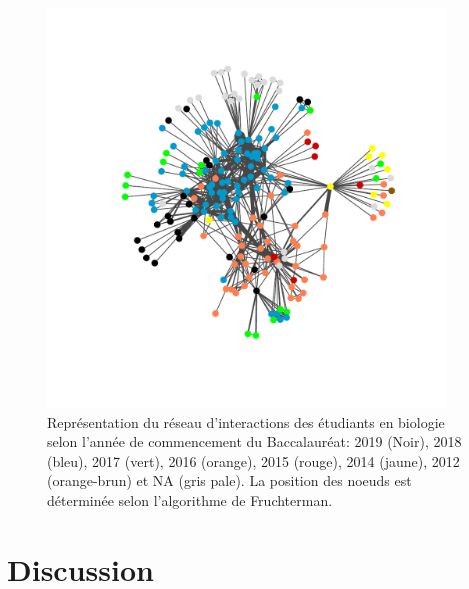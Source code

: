 \documentclass[letterpaper,twocolumn,showkeys, 12pt]{article}
\begin{document}
\begin{figure}[h]
 \center
  \includegraphics[width=400,trim={20mm 20mm 20mm 20mm},clip]{Figure 3.pdf}
  \caption{Représentation du réseau d'interactions des étudiants en biologie selon l'année de commencement du Baccalauréat: 2019 (Noir), 2018 (bleu), 2017 (vert), 2016 (orange), 2015 (rouge), 2014 (jaune), 2012 (orange-brun) et NA (gris pale). La position des noeuds est déterminée selon l'algorithme de Fruchterman.}
  \label{Figure 3}
\end{figure}


\section*{Discussion}
\end{document}
